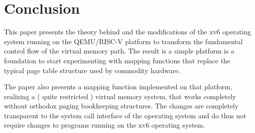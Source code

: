 \chapter{Conclusion}

\label{chap:conclusion}

\cite{choudhuri2005software} %


This paper presents the theory behind and the modifications of the xv6 operating system running on the QEMU/RISC-V platform to transform the fundamental control flow of the virtual memory path. The result is a simple platform is a foundation to start experimenting with mapping functions that replace the typical page table structure used by commodity hardware.

The paper also presents a mapping function implemented on that platform, realizing a ( quite restricted ) virtual memory system, that works completely without orthodox paging bookkeeping structures. The changes are completely transparent  to the system call interface of the operating system and do thus not require changes to programs running on the xv6 operating system.

